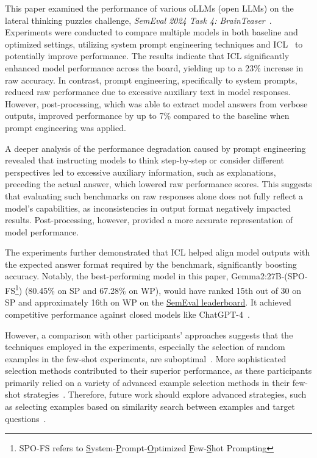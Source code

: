 This paper examined the performance of various \aclp{oLLM} (open LLMs) on the lateral thinking puzzles challenge, \textit{SemEval 2024 Task 4: BrainTeaser}~\cite{jiangBRAINTEASERLateralThinking2023}. Experiments were conducted to compare multiple models in both baseline and optimized settings, utilizing system prompt engineering techniques and \acf{ICL}~\cite{brownLanguageModelsAre2020} to potentially improve performance. The results indicate that \ac{ICL} significantly enhanced model performance across the board, yielding up to a 23\% increase in raw accuracy. In contrast, prompt engineering, specifically to system prompts, reduced raw performance due to excessive auxiliary text in model responses. However, post-processing, which was able to extract model answers from verbose outputs, improved performance by up to 7\% compared to the baseline when prompt engineering was applied.

A deeper analysis of the performance degradation caused by prompt engineering revealed that instructing models to think step-by-step or consider different perspectives led to excessive auxiliary information, such as explanations, preceding the actual answer, which lowered raw performance scores. This suggests that evaluating such benchmarks on raw responses alone does not fully reflect a model's capabilities, as inconsistencies in output format negatively impacted results. Post-processing, however, provided a more accurate representation of model performance.

The experiments further demonstrated that \ac{ICL} helped align model outputs with the expected answer format required by the benchmark, significantly boosting accuracy. Notably, the best-performing model in this paper, Gemma2:27B-(SPO-FS\footnote{SPO-FS refers to \underline{S}ystem-\underline{P}rompt-\underline{O}ptimized \underline{F}ew-\underline{S}hot Prompting}) (80.45\% on \ac{SP} and 67.28\% on \ac{WP}), would have ranked 15th out of 30 on \ac{SP} and approximately 16th on \ac{WP} on the \href{https://brainteasersem.github.io/\#leaderboard}{SemEval leaderboard}. It achieved competitive performance against closed models like ChatGPT-4~\cite{openaiGPT4TechnicalReport2024}.

However, a comparison with other participants' approaches suggests that the techniques employed in the experiments, especially the selection of random examples in the few-shot experiments, are suboptimal~\cite{jiangSemEval2024Task92024}. More sophisticated selection methods contributed to their superior performance, as these participants primarily relied on a variety of advanced example selection methods in their few-shot strategies~\cite{jiangSemEval2024Task92024}. Therefore, future work should explore advanced strategies, such as selecting examples based on similarity search between examples and target questions~\cite{HowUseFew}.

